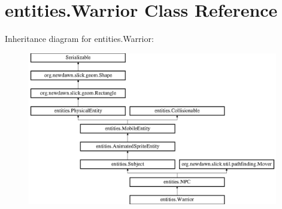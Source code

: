 \hypertarget{classentities_1_1_warrior}{}\section{entities.\+Warrior Class Reference}
\label{classentities_1_1_warrior}
Inheritance diagram for entities.\+Warrior\+:\begin{figure}[H]
\begin{center}
\leavevmode
\includegraphics[height=6.666667cm]{classentities_1_1_warrior}
\end{center}
\end{figure}
